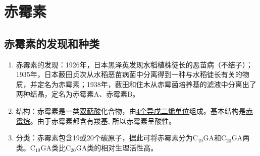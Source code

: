 \section{赤霉素}
\subsection{赤霉素的发现和种类}
\begin{enumerate}
    \item 赤霉素的发现：1926年，日本黑泽英发现水稻植株徒长的恶苗病（不结子）；1935年，日本薮田贞次从水稻恶苗病菌中分离得到一种与水稻徒长有关的物质，并定名为赤霉素；1938年，薮田和住木从赤霉菌培养基的滤液中分离出了两种结晶，定名为赤霉素A、赤霉素B。    
    \item 结构：赤霉素是一类\uline{双萜酸}化合物，由\uline{4个异戊二烯单位}组成。基本结构是\uline{赤霉烷}。由于赤霉素都含有羧基, 所以赤霉素呈酸性。
    \item 分类：赤霉素包含19或20个碳原子，据此可将赤霉素分为C$_19$GA和C$_20$GA两类。C$_19$GA类比C$_20$GA类的相对生理活性高。
\end{enumerate}
